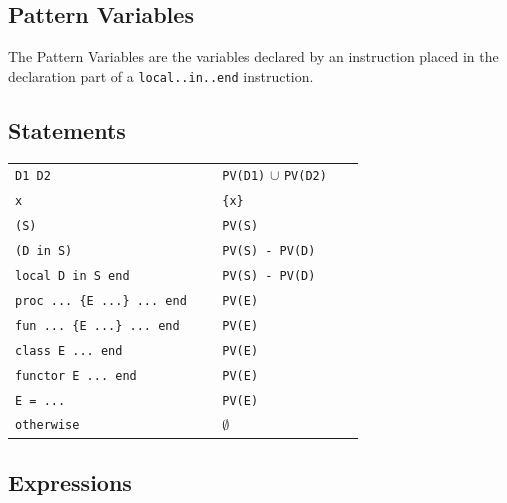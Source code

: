 \documentclass[a4paper]{memoir}
\begin{document}
\begin{appendices}
\chapter{Pattern Variables}\label{appendix:patternvariables}
The Pattern Variables are the variables declared by an instruction placed in the declaration part of a \lstinline!local..in..end! instruction. 
\section{Statements}

\begin{tabular} {l l}
\lstinline!D1 D2                      ! & \lstinline!PV(D1)! $\cup$ \lstinline!PV(D2)! \\
\lstinline!x                          ! & \lstinline!{x}!                  \\
\lstinline!(S)                        ! & \lstinline!PV(S)             ! \\
\lstinline!(D in S)                   ! & \lstinline!PV(S) - PV(D)     ! \\
\lstinline!local D in S end           ! & \lstinline!PV(S) - PV(D)     ! \\
\lstinline!proc ... {E ...} ... end   ! & \lstinline!PV(E)             ! \\
\lstinline!fun ... {E ...} ... end    ! & \lstinline!PV(E)             ! \\
\lstinline!class E ... end            ! & \lstinline!PV(E)             ! \\
\lstinline!functor E ... end          ! & \lstinline!PV(E)             ! \\
\lstinline!E = ...                    ! & \lstinline!PV(E)             ! \\
\lstinline!otherwise                  ! & $\emptyset$          \\
\end{tabular}



\section{Expressions}


\end{appendices}
\end{document}
